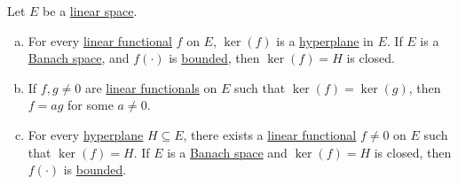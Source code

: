 \begin{proposition}\label{prop:linear-functionals-and-hyperplanes}
	Let \(E\) be a \hyperref[def:linear-vector-space]{linear space}.
	\begin{enumerate}[(a)]
		\item For every \hyperref[def:linear-functional]{linear functional} \(f\) on \(E\), \(\ker(f)\) is a \hyperref[def:hyperplane]{hyperplane} in \(E\). If \(E\) is a \hyperref[def:Banach-space]{Banach space}, and \(f(\cdot)\) is \hyperref[def:bounded-linear-functional]{bounded}, then \(\ker(f) = H\) is closed.
		\item If \(f, g \neq 0\) are \hyperref[def:linear-functional]{linear functionals} on \(E\) such that \(\ker(f) = \ker(g)\), then \(f = ag\) for some \(a \neq 0\).
		\item For every \hyperref[def:hyperplane]{hyperplane} \(H\subseteq E\), there exists a \hyperref[def:linear-functional]{linear functional} \(f \neq 0\) on \(E\) such that \(\ker(f) = H\). If \(E\) is a \hyperref[def:Banach-space]{Banach space} and \(\ker(f) = H\) is closed, then \(f(\cdot)\) is \hyperref[def:bounded-linear-functional]{bounded}.
	\end{enumerate}
\end{proposition}